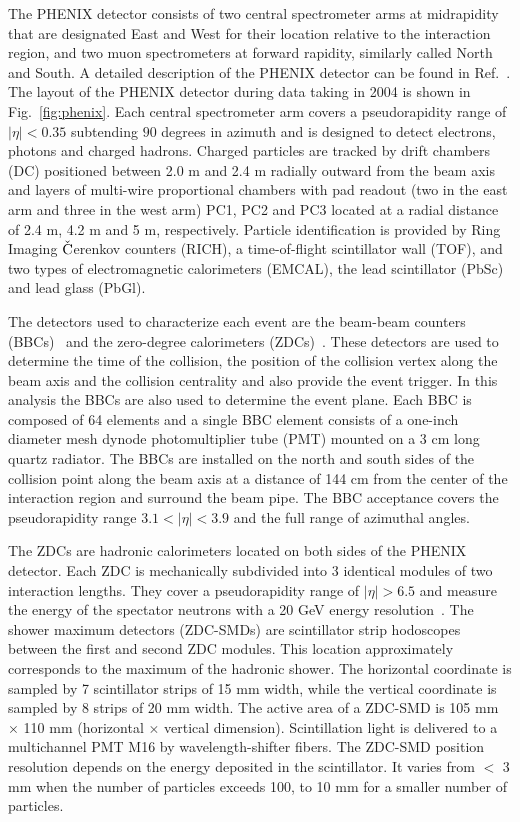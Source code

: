 \documentclass[aps,prc,superscriptaddress,showpacs,floatfix,twocolumn]{revtex4}
\begin{document}
The PHENIX detector consists of two central spectrometer arms at 
midrapidity that are designated East and West for their location 
relative to the interaction region, and two muon spectrometers 
at forward rapidity, similarly called North and South. A 
detailed description of the PHENIX detector can be found in 
Ref.~\cite{Adcox:2003zm}. The layout of the PHENIX detector 
during data taking in 2004 is shown in Fig.~\ref{fig:phenix}. 
Each central spectrometer arm covers a pseudorapidity range of 
$|\eta| < 0.35$ subtending $90$ degrees in azimuth and is 
designed to detect electrons, photons and charged hadrons.  
Charged particles are tracked by drift chambers (DC) positioned 
between 2.0 m and 2.4 m radially outward from the beam axis and 
layers of multi-wire proportional chambers with pad readout (two 
in the east arm and three in the west arm) PC1, PC2 and PC3 
located at a radial distance of 2.4 m, 4.2 m and 5 m, 
respectively. Particle identification is provided by Ring 
Imaging $\check{\rm C}$erenkov counters (RICH), a time-of-flight 
scintillator wall (TOF), and two types of electromagnetic 
calorimeters (EMCAL), the lead scintillator (PbSc) and lead 
glass (PbGl).

The detectors used to characterize each event are the beam-beam 
counters (BBCs)~\cite{Allen:2003zt} and the zero-degree 
calorimeters (ZDCs)~\cite{Adler:2003sp}. These detectors are 
used to determine the time of the collision, the position of the 
collision vertex along the beam axis and the collision 
centrality and also provide the event trigger. In this analysis 
the BBCs are also used to determine the event plane. Each BBC is 
composed of 64 elements and a single BBC element consists of a 
one-inch diameter mesh dynode photomultiplier tube (PMT) mounted 
on a 3 cm long quartz radiator. The BBCs are installed on the 
north and south sides of the collision point along the beam axis 
at a distance of 144 cm from the center of the interaction 
region and surround the beam pipe. The BBC acceptance covers the 
pseudorapidity range $3.1 < |\eta | < 3.9 $ and the full range 
of azimuthal angles.

The ZDCs are hadronic calorimeters located on both sides of the 
PHENIX detector. Each ZDC is mechanically subdivided into 3 
identical modules of two interaction lengths. They cover a 
pseudorapidity range of $|\eta| > 6.5$ and measure the energy of 
the spectator neutrons with a 20 GeV energy 
resolution~\cite{Adler:2003sp}. The shower maximum detectors 
(ZDC-SMDs) are scintillator strip hodoscopes between the first 
and second ZDC modules. This location approximately corresponds 
to the maximum of the hadronic shower. The horizontal coordinate 
is sampled by 7 scintillator strips of 15 mm width, while the 
vertical coordinate is sampled by 8 strips of 20 mm width. The 
active area of a ZDC-SMD is 105 mm $\times$ 110 mm (horizontal 
$\times$ vertical dimension). Scintillation light is delivered 
to a multichannel PMT M16 by wavelength-shifter fibers. The 
ZDC-SMD position resolution depends on the energy deposited in 
the scintillator. It varies from $<$ 3 mm when the number of 
particles exceeds 100, to 10 mm for a smaller number of 
particles.
\end{document}
